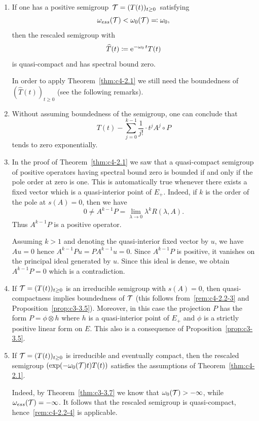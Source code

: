 \begin{remarks}\label{rem:c4-2.2}
\begin{enumerate}[\upshape (i), wide, labelindent=.25em]

\item \label{rem:c4-2.2-1}
If one has a positive semigroup\, $\TT = (T(t))_{t \geq 0}$\,  satisfying
\[
\omega_{ess}(\mathcal{T}) <  \omega_0(\mathcal{T}) \eqqcolon \omega_0, 
\]
then the rescaled semigroup with 
\[
\widehat{T}(t) \coloneqq \mathrm{e}^{-\omega_0 \, t }T(t)
\]
is quasi-compact and has spectral bound zero.

In order to apply Theorem~\ref{thm:c4-2.1} we still need the boundedness of\/ $(\widehat{T}(t))_{t\geq 0}$ (see the following remarks).

\item \label{rem:c4-2.2-2}
Without assuming boundedness of the semigroup, one can conclude that
\[
T(t) - \sum_{j=0}^{k-1} \frac{1}{j!} \cdot t^{j}A^{j}{\circ}P
\]
tends to zero exponentially.

\item \label{rem:c4-2.2-3}
In the proof of Theorem~\ref{thm:c4-2.1} we saw that a quasi-compact semigroup of positive operators having spectral bound zero is bounded if and only if the pole order at zero is one.
This is automatically true whenever there exists a fixed vector which is a quasi-interior point of\/ $E_{+}$.
Indeed, if\/ $k$ is the order of the pole at $s(A) = 0$, then we have 
\[
0 \neq A^{k-1}P = \lim_{\lambda \to 0} \lambda^{k}R(\lambda,A).
\]
Thus $A^{k-1}P$ is a positive operator.

Assuming $k > 1$ and denoting the quasi-interior fixed vector by $u$, we have $Au = 0$ hence $A^{k-1}Pu = PA^{k-1}u = 0$.
Since $A^{k-1}P$ is positive, it vanishes on the principal ideal generated by $u$.
Since this ideal is dense, we obtain $A^{k-1}P = 0$ which is a contradiction.

\item  \label{rem:c4-2.2-4}
If\/ $\TT = (T(t))_{t \geq 0}$ is an irreducible semigroup with $s(A) = 0$, then quasi-compactness implies boundedness of\/ $\mathcal{T}$ (this follows from~\ref{rem:c4-2.2-3} and Proposition~\ref{prop:c3-3.5}).
Moreover, in this case the projection $P$ has the form $P = \phi \otimes h$ where $h$ 
is a quasi-interior point of\/ $E_{+}$ and $\phi$ is a strictly positive linear form on $E$.
This also is a consequence of Proposition~\ref{prop:c3-3.5}.

\item  \label{rem:c4-2.2-5}
If\/ $\TT = (T(t))_{t \geq 0}$ is irreducible and eventually compact, then the rescaled semigroup $(\exp(-\omega_0(\mathcal{T})t)T(t))$ satisfies the assumptions of Theorem~\ref{thm:c4-2.1}.

Indeed, by Theorem~\ref{thm:c3-3.7} we know that $\omega_0(\mathcal{T}) > -\infty$, while $\omega_{ess}(\mathcal{T}) = -\infty$.
It follows that the rescaled semigroup is quasi-compact, hence~\ref{rem:c4-2.2-4} is applicable.
\end{enumerate}
\end{remarks}
